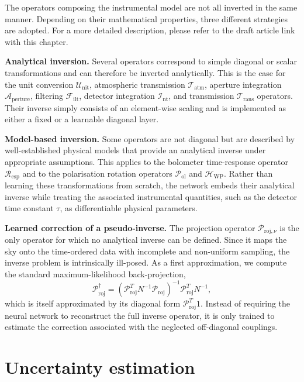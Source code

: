 \documentclass[../../thesis.tex]{subfiles}
\begin{document}
The operators composing the instrumental model are not all inverted in the same manner. Depending on their mathematical properties, three different strategies are adopted. For a more detailed description, please refer to the draft article link with this chapter.

\textbf{Analytical inversion.}
Several operators correspond to simple diagonal or scalar transformations and can therefore be inverted analytically. This is the case for the unit conversion $\mathcal{U}_{\text{nit}}$, atmospheric transmission $\mathcal{T}_{\text{atm}}$, aperture integration $\mathcal{A}_{\text{perture}}$, filtering $\mathcal{F}_{\text{ilt}}$, detector integration $\mathcal{I}_{\text{nt}}$, and transmission $\mathcal{T}_{\text{rans}}$ operators. Their inverse simply consists of an element-wise scaling and is implemented as either a fixed or a learnable diagonal layer.

\textbf{Model-based inversion.}
Some operators are not diagonal but are described by well-established physical models that provide an analytical inverse under appropriate assumptions. This applies to the bolometer time-response operator $\mathcal{R}_{\text{esp}}$ and to the polarisation rotation operators $\mathcal{P}_{\text{ol}}$ and $\mathcal{H}_{\text{WP}}$. Rather than learning these transformations from scratch, the network embeds their analytical inverse while treating the associated instrumental quantities, such as the detector time constant $\tau$, as differentiable physical parameters.

\textbf{Learned correction of a pseudo-inverse.}
The projection operator $\mathcal{P}_{\text{roj}, \nu}$ is the only operator for which no analytical inverse can be defined. Since it maps the sky onto the time-ordered data with incomplete and non-uniform sampling, the inverse problem is intrinsically ill-posed. As a first approximation, we compute the standard maximum-likelihood back-projection,
\[
\mathcal{P}_{\text{roj}}^\dagger = (\mathcal{P}_{\text{roj}}^T N^{-1}\mathcal{P}_{\text{roj}})^{-1}\mathcal{P}_{\text{roj}}^TN^{-1},
\]
which is itself approximated by its diagonal form $\mathcal{P}_{\text{roj}}^T1$. Instead of requiring the neural network to reconstruct the full inverse operator, it is only trained to estimate the correction associated with the neglected off-diagonal couplings.

\section{Uncertainty estimation}
\end{document}

